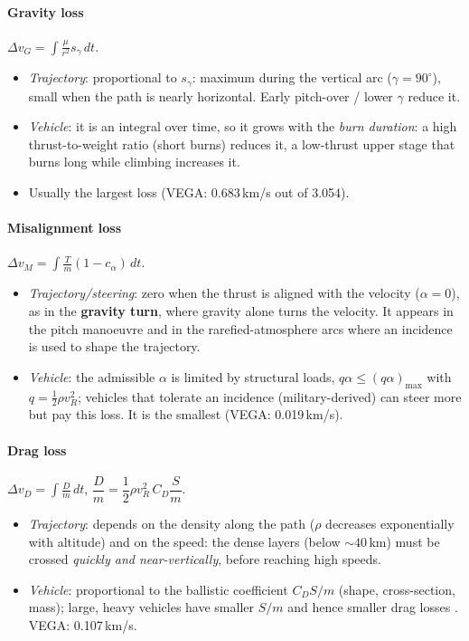 \paragraph{Gravity loss} $\Delta v_G=\displaystyle\int\frac{\mu}{r^2}s_\gamma\,dt$.
\begin{itemize}
\item \emph{Trajectory}: proportional to $s_\gamma$: maximum during the vertical arc ($\gamma=90^\circ$), small when the path is
nearly horizontal. Early pitch-over / lower $\gamma$ reduce it.
\item \emph{Vehicle}: it is an integral over time, so it grows with the \emph{burn duration}: a high thrust-to-weight ratio
(short burns) reduces it, a low-thrust upper stage that burns long while climbing increases it.
\item Usually the largest loss (VEGA: 0.683\,km/s out of 3.054).
\end{itemize}

\paragraph{Misalignment loss} $\Delta v_M=\displaystyle\int\frac{T}{m}(1-c_\alpha)\,dt$.
\begin{itemize}
\item \emph{Trajectory/steering}: zero when the thrust is aligned with the velocity ($\alpha=0$), as in the \textbf{gravity turn}, where
gravity alone turns the velocity. It appears in the pitch manoeuvre and in the rarefied-atmosphere arcs where an incidence is used
to shape the trajectory.
\item \emph{Vehicle}: the admissible $\alpha$ is limited by structural loads, $q\alpha\le(q\alpha)_{\max}$ with $q=\frac12\rho v_R^2$; vehicles
that tolerate an incidence (military-derived) can steer more but pay this loss. It is the smallest (VEGA: 0.019\,km/s).
\end{itemize}

\paragraph{Drag loss} $\Delta v_D=\displaystyle\int\frac{D}{m}\,dt$, \quad $\dfrac{D}{m}=\dfrac12\rho v_R^2\,C_D\dfrac{S}{m}$.
\begin{itemize}
\item \emph{Trajectory}: depends on the density along the path ($\rho$ decreases exponentially with altitude) and on the speed:
the dense layers (below $\sim40$\,km) must be crossed \emph{quickly and near-vertically}, before reaching high speeds.
\item \emph{Vehicle}: proportional to the ballistic coefficient $C_DS/m$ (shape, cross-section, mass); large, heavy vehicles have
smaller $S/m$ and hence smaller drag losses \notinnotes. VEGA: 0.107\,km/s.
\end{itemize}

